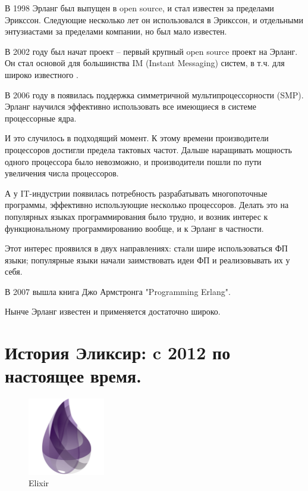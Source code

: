 В 1998 Эрланг был выпущен в open source, и стал известен за пределами Эрикссон. Следующие несколько лет он использовался в Эрикссон, и отдельными энтузиастами за пределами компании, но был мало известен.

В 2002 году был начат проект  -- первый крупный open source проект на Эрланг. Он стал основой для большинства IM (Instant Messaging) систем, в т.ч. для широко известного .

В 2006 году в появилась поддержка симметричной мультипроцессорности (SMP). Эрланг научился эффективно использовать все имеющиеся в системе процессорные ядра.

И это случилось в подходящий момент. К этому времени производители процессоров достигли предела тактовых частот. Дальше наращивать мощность одного процессора было невозможно, и производители пошли по пути увеличения числа процессоров.

А у IT-индустрии появилась потребность разрабатывать многопоточные программы, эффективно использующие несколько процессоров. Делать это на популярных языках программирования было трудно, и возник интерес к функциональному программированию вообще, и к Эрланг в частности.

Этот интерес проявился в двух направлениях:
\blist
\e стали шире использоваться ФП языки;
\e популярные языки начали заимствовать идеи ФП и реализовывать их у себя.
\elist

В 2007 вышла книга Джо Армстронга "Programming Erlang".

Нынче Эрланг известен и применяется достаточно широко.

\section{История Эликсир: c 2012 по настоящее время.}

\begin{figure}[h]
  \centering
  \includegraphics[width=0.3\textwidth]{../lesson_02/img/elixir_logo.png}
  \caption{Elixir}
\end{figure}


